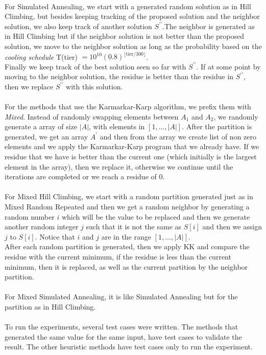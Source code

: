 \documentclass[tikz, 12pt]{scrartcl}
\begin{document}
\\
For Simulated Annealing, we start with a generated random solution as in Hill Climbing, but besides keeping tracking of the proposed solution and the neighbor solution, we also keep track of another solution $S^{\prime \prime}$.The neighbor is generated as in Hill Climbing but if the neighbor solution is not better than the proposed solution, we move to the neighbor solution as long as the probability based on the \textit{cooling schedule} T(tier) $= 10^{10}(0.8)^{\lfloor \mbox{tier} / 300\rfloor}$.\\
Finally we keep track of the best solution seen so far with $S^{\prime \prime}$. If at some point by moving to the neighbor solution, the residue is better than the residue in $S^{\prime \prime}$, then we replace $S^{\prime \prime}$ with this solution.\\
\\
For the methods that use the Karmarkar-Karp algorithm, we prefix them with \textit{Mixed}. Instead of randomly swapping elements between $A_1$ and $A_2$, we randomly generate a array of size $|A|$, with elements in $[1, \ldots, |A|]$. After the partition is generated, we get an array $A^{\prime}$ and then from the array we create list of non zero elements and we apply the Karmarkar-Karp program that we already have. If we residue that we have is better than the current one (which initially is the largest element in the array), then we replace it, otherwise we continue until the iterations are completed or we reach a residue of 0.\\
\\
For Mixed Hill Climbing, we start with a random partition generated just as in Mixed Random Repeated and then we get a random neighbor by generating a random number $i$ which will be the value to be replaced and then we generate another random integer $j$ such that it is not the same as $S[i]$ and then we assign $j$ to $S[i]$. Notice that $i$ and $j$ are in the range $[1, \ldots, |A|]$. \\
After each random partition is generated, then we apply KK and compare the residue with the current minimum, if the residue is less than the current minimum, then it is replaced, as well as the current partition by the neighbor partition.\\
\\
For Mixed Simulated Annealing, it is like Simulated Annealing but for the partition as in Hill Climbing. \\
\\
To run the experiments, several test cases were written. The methods that generated the same value for the same input, have test cases to validate the result. The other heuristic methods have test cases only to run the experiment.
\end{document}
